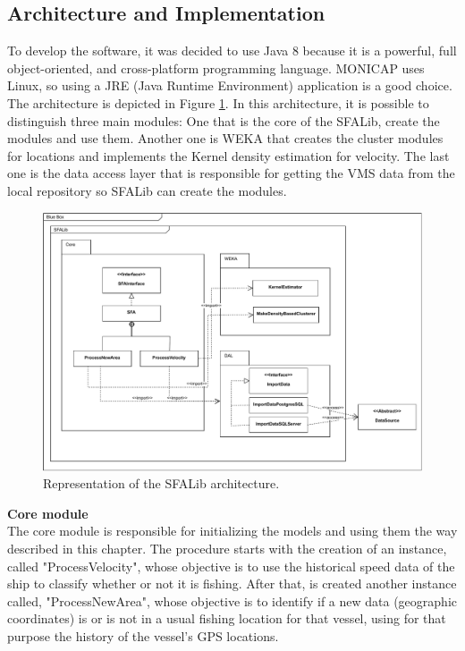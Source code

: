 

\subsection{Architecture and Implementation} %
\label{sub:architecturee_implementation}
To develop the software, it was decided to use Java 8 \cite{WEBSITE:OraJava8} because it is a powerful, full object-oriented, and cross-platform programming language. MONICAP uses Linux, so using a JRE (Java Runtime Environment) application is a good choice.
The architecture is depicted in Figure \ref{fig:SFALib_Prof}. In this architecture, it is possible to distinguish three main modules: One that is the core of the SFALib, create the modules and use them. Another one is WEKA \cite{WEBSITE:Weka} that creates the cluster modules for locations and implements the Kernel density estimation  for velocity. The last one is the data access layer that is responsible for getting the VMS data from the local repository so SFALib can create the modules.


\begin{figure}[H]
\centering
\includegraphics[width=1.0\linewidth]{Chapters/img/SFALib_Prof.pdf}
\caption{Representation of the SFALib architecture.}
\label{fig:SFALib_Prof}
\end{figure}



\textbf{Core module} \\The core module is responsible for initializing the models and using them the way described in this chapter. The procedure starts with the creation of an instance, called  "ProcessVelocity", whose objective is to use the historical speed data of the ship to classify whether or not it is fishing. After that, is created another instance called, "ProcessNewArea", whose objective is to identify if a new data (geographic coordinates) is or is not in a usual fishing location for that vessel, using for that purpose the history of the vessel's GPS locations.

